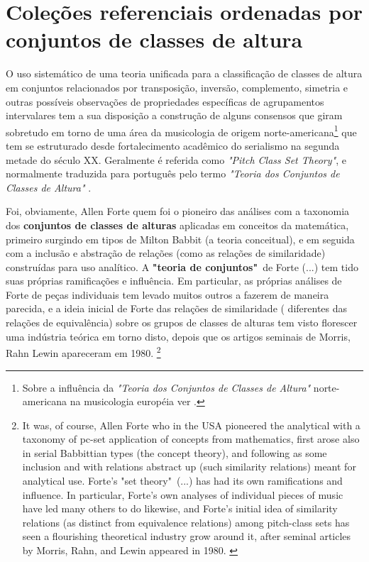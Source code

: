 \documentclass[
	12pt,				%
	openright,			%
	twoside,			%
	a4paper,			%
	english,			%
	french,				%
	spanish,			%
	brazil				%
	]{abntex2}
\begin{document}
\section{Coleções referenciais ordenadas por conjuntos de classes de altura}

O uso sistemático de uma teoria unificada para a classificação de classes de altura em conjuntos relacionados por transposição, inversão, complemento, simetria e outras possíveis observações de propriedades específicas de agrupamentos intervalares tem a sua disposição a construção de alguns consensos que giram sobretudo em torno de uma área da musicologia de origem norte-americana\footnote{Sobre a influência da \textit{"Teoria dos Conjuntos de Classes de Altura"} norte-americana na musicologia européia ver .} que tem se estruturado desde fortalecimento acadêmico do serialismo na segunda metade do século XX. Geralmente é referida como \textit{"Pitch Class Set Theory"}, e normalmente traduzida para português pelo termo \textit{"Teoria dos Conjuntos de Classes de Altura"} \cite{straus2004}.

\begin{citacao}
Foi, obviamente, Allen Forte quem foi o pioneiro das análises com a taxonomia dos \textbf{conjuntos de classes de alturas} aplicadas em conceitos da matemática, primeiro surgindo em tipos de Milton Babbit (a teoria conceitual), e em seguida com a inclusão e abstração de relações (como as relações de similaridade) construídas para uso analítico. A \textbf{"teoria de conjuntos"}\ de Forte (...) tem tido suas próprias ramificações e influência. Em particular, as próprias análises de Forte de peças individuais tem levado muitos outros a fazerem de maneira parecida, e a ideia inicial de Forte das relações de similaridade ( diferentes das relações de equivalência) sobre os grupos de classes de alturas tem visto florescer uma indústria teórica em torno disto, depois que os artigos seminais de Morris, Rahn  Lewin apareceram em 1980. \cite[p.  130]{rahn2004swerve}\footnote{
It was, of course, Allen Forte who in the USA pioneered the analytical with a taxonomy of pc-set application of concepts from mathematics, first arose also in serial Babbittian types (the concept theory), and following as some inclusion and with relations abstract up (such similarity relations) meant for analytical use. Forte's "set theory"\  (...) has had its own ramifications and influence. In particular, Forte's own analyses of individual pieces of music have led many others to do likewise, and Forte's initial idea of similarity relations (as distinct from equivalence relations) among pitch-class sets has seen a flourishing theoretical industry grow around it, after seminal articles by Morris, Rahn, and Lewin appeared in 1980. \cite[p.  130, grifo nossos]{rahn2004swerve}}
\end{citacao}
\end{document}
